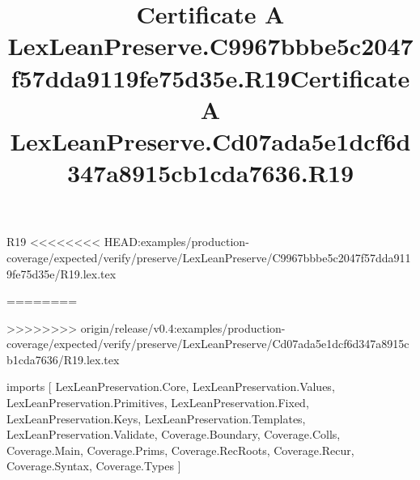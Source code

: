 \begin{lexlean}{R19}
<<<<<<<< HEAD:examples/production-coverage/expected/verify/preserve/LexLeanPreserve/C9967bbbe5c2047f57dda9119fe75d35e/R19.lex.tex
\title{Certificate A LexLeanPreserve.C9967bbbe5c2047f57dda9119fe75d35e.R19}
========
\title{Certificate A LexLeanPreserve.Cd07ada5e1dcf6d347a8915cb1cda7636.R19}
>>>>>>>> origin/release/v0.4:examples/production-coverage/expected/verify/preserve/LexLeanPreserve/Cd07ada5e1dcf6d347a8915cb1cda7636/R19.lex.tex
\begin{coremodule}
imports [
  LexLeanPreservation.Core,
  LexLeanPreservation.Values,
  LexLeanPreservation.Primitives,
  LexLeanPreservation.Fixed,
  LexLeanPreservation.Keys,
  LexLeanPreservation.Templates,
  LexLeanPreservation.Validate,
  Coverage.Boundary,
  Coverage.Colls,
  Coverage.Main,
  Coverage.Prims,
  Coverage.RecRoots,
  Coverage.Recur,
  Coverage.Syntax,
  Coverage.Types
]


\end{coremodule}
\end{lexlean}
